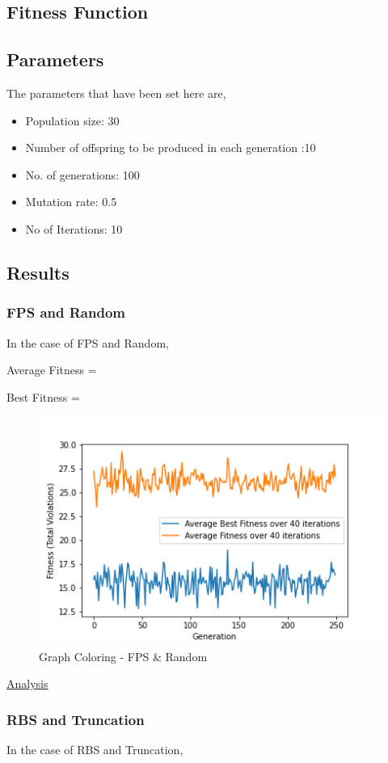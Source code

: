 \documentclass[11pt, letterpaper]{article}
\begin{document}
\subsection {Fitness Function}
\subsection {Parameters}
The parameters that have been set here are,
\begin{itemize}
    \item Population size: 30
    \item Number of offspring to be produced in each generation :10
    \item No. of generations: 100
    \item Mutation rate: 0.5
    \item No of Iterations: 10
\end{itemize}
\subsection {Results} 
\subsubsection {FPS and Random}
In the case of FPS and Random,

Average Fitness = 

Best Fitness = 
\begin{figure}[H]
    \centering
    \includegraphics[scale = 0.6]{images/graphcoloring_fp_rd.png}
    \caption {Graph Coloring - FPS \& Random}
    \label {fig:gcFR}
\end{figure}
\underline{Analysis}
\subsubsection {RBS and Truncation}
In the case of RBS and Truncation,
\end{document}
